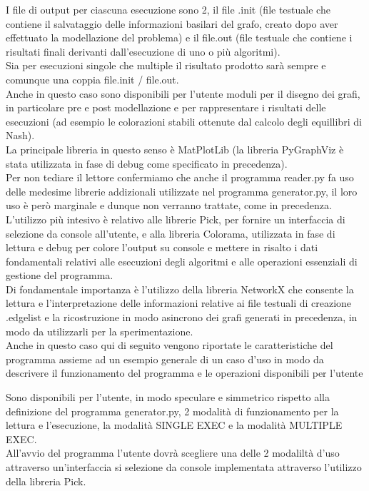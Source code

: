 I file di output per ciascuna esecuzione sono 2, il file .init (file testuale che contiene il salvataggio delle informazioni basilari del grafo, creato dopo aver effettuato la modellazione del problema) e il file.out (file testuale che contiene i risultati finali derivanti dall'esecuzione di uno o più algoritmi).\\

Sia per esecuzioni singole che multiple il risultato prodotto sarà sempre e comunque una coppia file.init / file.out.\\  

Anche in questo caso sono disponibili per l'utente moduli per il disegno dei grafi, in particolare pre e post modellazione e per rappresentare i risultati delle esecuzioni (ad esempio le colorazioni stabili ottenute dal calcolo degli equillibri di Nash).\\
La principale libreria in questo senso è MatPlotLib (la libreria PyGraphViz è stata utilizzata in fase di debug come specificato in precedenza).\\

Per non tediare il lettore confermiamo che anche il programma reader.py fa uso delle medesime librerie addizionali utilizzate nel programma generator.py, il loro uso è però marginale e dunque non verranno trattate, come in precedenza.\\
L'utilizzo più intesivo è relativo alle librerie Pick, per fornire un interfaccia di selezione da console all'utente, e alla libreria Colorama, utilizzata in fase di lettura e debug per colore l'output su console e mettere in risalto i dati fondamentali relativi alle esecuzioni degli algoritmi e alle operazioni essenziali di gestione del programma.\\

Di fondamentale importanza è l'utilizzo della libreria NetworkX che consente la lettura e l'interpretazione delle informazioni relative ai file testuali di creazione .edgelist e la ricostruzione in modo asincrono dei grafi generati in precedenza, in modo da utilizzarli per la sperimentazione.\\

Anche in questo caso qui di seguito vengono riportate le caratteristiche del programma assieme ad un esempio generale di un caso d'uso in modo da descrivere il funzionamento del programma e le operazioni disponibili per l'utente

Sono disponibili per l'utente, in modo speculare e simmetrico rispetto alla definizione del programma generator.py, 2 modalità di funzionamento per la lettura e l'esecuzione, la modalità SINGLE EXEC e la modalità MULTIPLE EXEC.\\
All'avvio del programma l'utente dovrà scegliere una delle 2 modaliltà d'uso attraverso un'interfaccia si selezione da console implementata attraverso l'utilizzo della libreria Pick.\\


